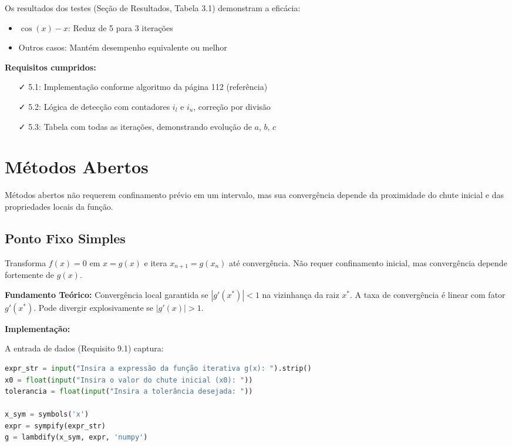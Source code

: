 \documentclass[
	12pt,				%
	openright,			%
	oneside,			%
	a4paper,			%
	english,			%
	brazil				%
	]{abntex2}
\begin{document}
Os resultados dos testes (Seção de Resultados, Tabela 3.1) demonstram a eficácia:

\begin{itemize}
    \item $\cos(x) - x$: Reduz de 5 para 3 iterações
    \item Outros casos: Mantém desempenho equivalente ou melhor
\end{itemize}

\vspace{0.3cm}

\textbf{Requisitos cumpridos:}
\begin{itemize}
    \item[✓] 5.1: Implementação conforme algoritmo da página 112 (referência)
    \item[✓] 5.2: Lógica de detecção com contadores $i_l$ e $i_u$, correção por divisão
    \item[✓] 5.3: Tabela com todas as iterações, demonstrando evolução de $a$, $b$, $c$
\end{itemize}

\section{Métodos Abertos}

Métodos abertos não requerem confinamento prévio em um intervalo, mas sua convergência depende da proximidade do chute inicial e das propriedades locais da função.

\subsection{Ponto Fixo Simples}

Transforma $f(x) = 0$ em $x = g(x)$ \cite{burden2015} e itera $x_{n+1} = g(x_n)$ até convergência. Não requer confinamento inicial, mas convergência depende fortemente de $g(x)$.

\textbf{Fundamento Teórico:}
Convergência local garantida se $|g'(x^*)| < 1$ na vizinhança da raiz $x^*$. A taxa de convergência é linear com fator $g'(x^*)$. Pode divergir explosivamente se $|g'(x)| > 1$.

\vspace{0.3cm}

\textbf{Implementação:}

A entrada de dados (Requisito 9.1) captura:

\begin{lstlisting}[language=Python, caption={Requisito 9.1 - Entrada do Método}]
expr_str = input("Insira a expressão da função iterativa g(x): ").strip()
x0 = float(input("Insira o valor do chute inicial (x0): "))
tolerancia = float(input("Insira a tolerância desejada: "))

x_sym = symbols('x')
expr = sympify(expr_str)
g = lambdify(x_sym, expr, 'numpy')
\end{lstlisting}
\end{document}
